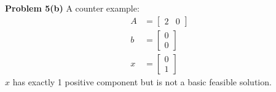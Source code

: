 \documentclass[12pt]{article}
\begin{document}
\vspace{\baselineskip}
\noindent
\textbf{Problem 5(b)}
A counter example:
\begin{align*}
    A&=\begin{bmatrix} 2&0 \end{bmatrix} \\
    b&=\begin{bmatrix} 0\\0 \end{bmatrix} \\
    x&=\begin{bmatrix} 0\\1 \end{bmatrix}
\end{align*}
$x$ has exactly 1 positive component but is not a basic feasible solution.



\end{document}
